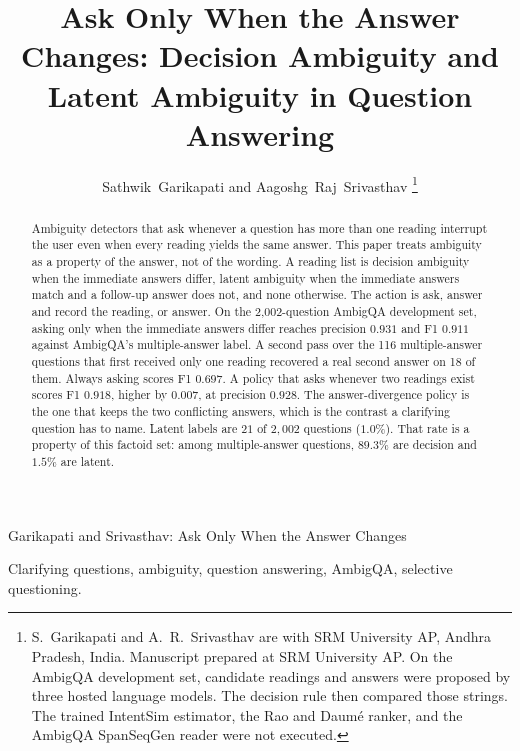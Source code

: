 \documentclass[journal]{IEEEtran}
\begin{document}
\title{Ask Only When the Answer Changes: Decision Ambiguity and Latent Ambiguity in Question Answering}

\author{Sathwik~Garikapati and Aagoshg~Raj~Srivasthav%
\thanks{S.\ Garikapati and A.\ R.\ Srivasthav are with SRM University AP, Andhra Pradesh, India.
Manuscript prepared at SRM University AP.
On the AmbigQA development set, candidate readings and answers were proposed by three hosted language models.
The decision rule then compared those strings.
The trained IntentSim estimator, the Rao and Daum\'e ranker, and the AmbigQA SpanSeqGen reader were not executed.}%
}

%
{Garikapati and Srivasthav: Ask Only When the Answer Changes}

\maketitle

\begin{abstract}
Ambiguity detectors that ask whenever a question has more than one reading interrupt the user even when every reading yields the same answer.
This paper treats ambiguity as a property of the answer, not of the wording.
A reading list is decision ambiguity when the immediate answers differ, latent ambiguity when the immediate answers match and a follow-up answer does not, and none otherwise.
The action is ask, answer and record the reading, or answer.
On the 2{,}002-question AmbigQA development set, asking only when the immediate answers differ reaches precision $0.931$ and F1 $0.911$ against AmbigQA's multiple-answer label.
A second pass over the 116 multiple-answer questions that first received only one reading recovered a real second answer on 18 of them.
Always asking scores F1 $0.697$.
A policy that asks whenever two readings exist scores F1 $0.918$, higher by $0.007$, at precision $0.928$.
The answer-divergence policy is the one that keeps the two conflicting answers, which is the contrast a clarifying question has to name.
Latent labels are $21$ of $2{,}002$ questions ($1.0\%$).
That rate is a property of this factoid set: among multiple-answer questions, $89.3\%$ are decision and $1.5\%$ are latent.
\end{abstract}

\begin{IEEEkeywords}
Clarifying questions, ambiguity, question answering, AmbigQA, selective questioning.
\end{IEEEkeywords}
\end{document}
